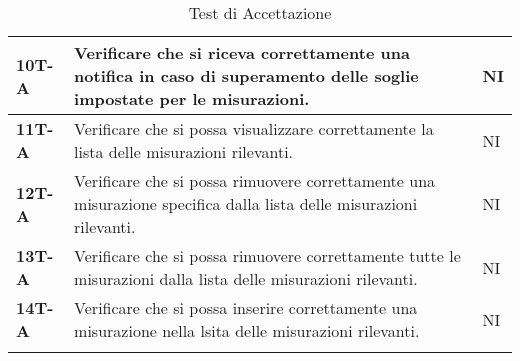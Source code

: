 \begin{longtable}{|>{\raggedright\arraybackslash}m{}|>{\raggedright\arraybackslash}m{}|>{\raggedright\arraybackslash}m{}|}
	\hline
	\textbf{10T-A}   & Verificare che si riceva correttamente una notifica in caso di superamento delle soglie impostate per le misurazioni. & NI\\
	\hline
	\textbf{11T-A}   & Verificare che si possa visualizzare correttamente la lista delle misurazioni rilevanti. & NI\\
	\hline
	\textbf{12T-A}   & Verificare che si possa rimuovere correttamente una misurazione specifica dalla lista delle misurazioni rilevanti. & NI\\
	\hline
	\textbf{13T-A}   & Verificare che si possa rimuovere correttamente tutte le misurazioni dalla lista delle misurazioni rilevanti. & NI\\
	\hline
	\textbf{14T-A}   & Verificare che si possa inserire correttamente una misurazione nella lsita delle misurazioni rilevanti. & NI\\
	\hline
	\caption{Test di Accettazione} %
	\label{table:16}
\end{longtable}
